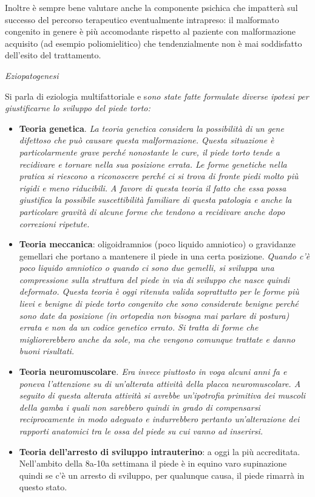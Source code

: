 \documentclass[]{article}
\begin{document}
Inoltre è sempre bene valutare anche la componente psichica che
impatterà sul successo del percorso terapeutico eventualmente
intrapreso: il malformato congenito in genere è più accomodante rispetto
al paziente con malformazione acquisito (ad esempio poliomielitico) che
tendenzialmente non è mai soddisfatto dell'esito del trattamento.

\emph{Eziopatogenesi}

Si parla di eziologia multifattoriale e s\emph{ono state fatte formulate
diverse ipotesi per giustificarne lo sviluppo del piede torto:}

\begin{itemize}
\item
  \textbf{Teoria genetica}. \emph{La teoria genetica considera la
  possibilità di un gene difettoso che può causare questa malformazione.
  Questa situazione è particolarmente grave perché nonostante le cure,
  il piede torto tende a recidivare e tornare nella sua posizione
  errata. Le forme genetiche nella pratica si riescono a riconoscere
  perché ci si trova di fronte piedi molto più rigidi e meno
  riducibili.} \emph{A favore di questa teoria il fatto che essa possa
  giustifica la possibile suscettibilità familiare di questa patologia e
  anche la particolare gravità di alcune forme che tendono a recidivare
  anche dopo correzioni ripetute.}
\item
  \textbf{Teoria meccanica}: oligoidramnios (poco liquido amniotico) o
  gravidanze gemellari che portano a mantenere il piede in una certa
  posizione. \emph{Quando c'è poco liquido amniotico o quando ci sono
  due gemelli, si sviluppa una compressione sulla struttura del piede in
  via di sviluppo che nasce quindi deformato. Questa teoria è oggi
  ritenuta valida soprattutto per le forme più lievi e benigne di piede
  torto congenito che sono considerate benigne perché sono date da
  posizione (in ortopedia non bisogna mai parlare di postura) errata e
  non da un codice genetico errato. Si tratta di forme che
  migliorerebbero anche da sole, ma che vengono comunque trattate e
  danno buoni risultati.}
\item
  \textbf{Teoria neuromuscolare}\emph{. Era invece piuttosto in voga
  alcuni anni fa e poneva l'attenzione su di un'alterata attività della
  placca neuromuscolare. A seguito di questa alterata attività si
  avrebbe un'ipotrofia primitiva dei muscoli della gamba i quali non
  sarebbero quindi in grado di compensarsi reciprocamente in modo
  adeguato e indurrebbero pertanto un'alterazione dei rapporti anatomici
  tra le ossa del piede su cui vanno ad inserirsi.}
\item
  \textbf{Teoria dell'arresto di sviluppo intrauterino}: a oggi la più
  accreditata. Nell'ambito della 8a-10a settimana il piede è in equino
  varo supinazione quindi se c'è un arresto di sviluppo, per qualunque
  causa, il piede rimarrà in questo stato.
\end{itemize}
\end{document}
